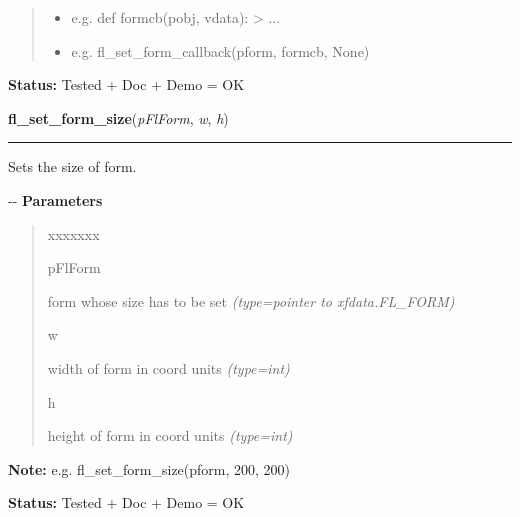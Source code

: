 \begin{boxedminipage}{\funcwidth}
\begin{quote}
\begin{itemize}
  \item
    \setlength{\parskip}{0.6ex}

e.g. def formcb(pobj, vdata): > ...


  \item 
e.g. fl\_set\_form\_callback(pform, formcb, None)


\end{itemize}

\end{quote}

\textbf{Status:} 
Tested + Doc + Demo = OK


    \end{boxedminipage}

    \label{xformslib:flbasic:fl_set_form_size}

    \vspace{0.5ex}

\hspace{.8\funcindent}\begin{boxedminipage}{\funcwidth}

    \raggedright \textbf{fl\_set\_form\_size}(\textit{pFlForm}, \textit{w}, \textit{h})

    \vspace{-1.5ex}

    \rule{\textwidth}{0.5\fboxrule}
\setlength{\parskip}{2ex}

Sets the size of form.

-{}-
\setlength{\parskip}{1ex}
      \textbf{Parameters}
      \vspace{-1ex}

      \begin{quote}
        \begin{Ventry}{xxxxxxx}

          \item[pFlForm]


form whose size has to be set
            {\it (type=pointer to xfdata.FL\_FORM)}

          \item[w]


width of form in coord units
            {\it (type=int)}

          \item[h]


height of form in coord units
            {\it (type=int)}

        \end{Ventry}

      \end{quote}

\textbf{Note:} 
e.g. fl\_set\_form\_size(pform, 200, 200)


\textbf{Status:} 
Tested + Doc + Demo = OK


    \end{boxedminipage}

